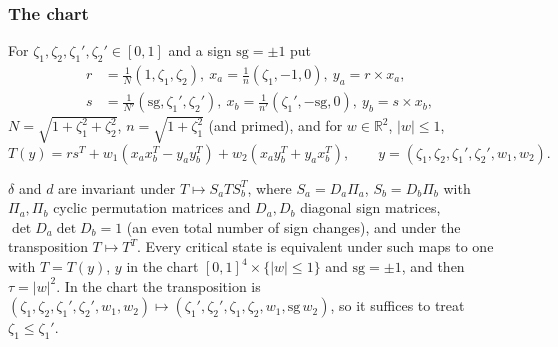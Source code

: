 \subsubsection*{The chart}
For $\zeta_1,\zeta_2,\zeta_1',\zeta_2'\in[0,1]$ and a sign $\mathrm{sg}=\pm1$ put
\begin{align*}
 r&=\tfrac1N(1,\zeta_1,\zeta_2),\ x_a=\tfrac1n(\zeta_1,-1,0),\ y_a=r\times x_a,\\
 s&=\tfrac1{N'}(\mathrm{sg},\zeta_1',\zeta_2'),\ x_b=\tfrac1{n'}(\zeta_1',-\mathrm{sg},0),\ y_b=s\times x_b,
\end{align*}
$N=\sqrt{1+\zeta_1^2+\zeta_2^2}$, $n=\sqrt{1+\zeta_1^2}$ (and primed), and for $w\in\mathbb R^2$, $|w|\le1$,
\begin{equation}\label{eq:fqe-critical-chart}
 T(y)=rs^T+w_1(x_ax_b^T-y_ay_b^T)+w_2(x_ay_b^T+y_ax_b^T),\qquad y=(\zeta_1,\zeta_2,\zeta_1',\zeta_2',w_1,w_2).
\end{equation}
\begin{lemma}\label{lem:fqe-critical-chart}
$\delta$ and $d$ are invariant under $T\mapsto S_aTS_b^T$, where $S_a=D_a\Pi_a$, $S_b=D_b\Pi_b$ with
$\Pi_a,\Pi_b$ cyclic permutation matrices and $D_a,D_b$ diagonal sign matrices, $\det D_a\det D_b=1$ (an even total number of
sign changes), and under the transposition $T\mapsto T^T$.  Every critical state is equivalent under such maps to one
with $T=T(y)$, $y$ in the chart $[0,1]^4\times\{|w|\le1\}$ and $\mathrm{sg}=\pm1$, and then $\tau=|w|^2$.
In the chart the transposition is $(\zeta_1,\zeta_2,\zeta_1',\zeta_2',w_1,w_2)\mapsto(\zeta_1',\zeta_2',\zeta_1,\zeta_2,w_1,\mathrm{sg}\,w_2)$, so it suffices to treat $\zeta_1\le\zeta_1'$.
\end{lemma}
